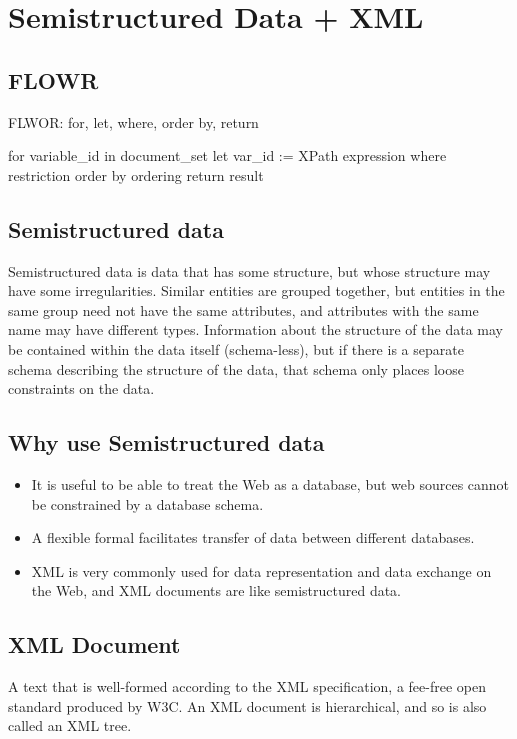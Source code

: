 \documentclass[10pt]{article}
\begin{document}
  \section*{Semistructured Data + XML}
    \subsection*{FLOWR}
    FLWOR: for, let, where, order by, return

    for variable\_id in document\_set 
    let var\_id := XPath expression 
    where restriction
    order by ordering
    return result
    \subsection*{Semistructured data}
        Semistructured data is data that has some structure, but whose structure may have some irregularities. Similar entities are grouped together, but entities in the same group need not have the same attributes, and attributes with the same name may have different types.
        Information about the structure of the data may be contained within the data itself (schema-less), but if there is a separate schema describing the structure of the data, that schema only places loose constraints on the data.
        \subsection*{Why use Semistructured data}
          \begin{itemize}
            \item It is useful to be able to treat the Web as a database, but web sources cannot be constrained by a database schema.
            \item A flexible formal facilitates transfer of data between different databases.
            \item XML is very commonly used for data representation and data exchange on the Web, and XML documents are like semistructured data.
          \end{itemize}
        
        \subsection*{XML Document}
          A text that is well-formed according to the XML specification, a fee-free open standard produced by W3C. An XML document is hierarchical, and so is also called an XML tree.
\end{document}
